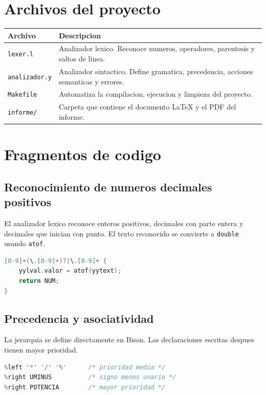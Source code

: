 \documentclass[12pt,a4paper]{article}
\begin{document}
\section{Archivos del proyecto}

\begin{longtable}{|p{4cm}|p{10cm}|}
\hline
\textbf{Archivo} & \textbf{Descripcion} \\
\hline
\texttt{lexer.l} & Analizador lexico. Reconoce numeros, operadores, parentesis y saltos de linea. \\
\hline
\texttt{analizador.y} & Analizador sintactico. Define gramatica, precedencia, acciones semanticas y errores. \\
\hline
\texttt{Makefile} & Automatiza la compilacion, ejecucion y limpieza del proyecto. \\
\hline
\texttt{informe/} & Carpeta que contiene el documento LaTeX y el PDF del informe. \\
\hline
\end{longtable}

\section{Fragmentos de codigo}

\subsection{Reconocimiento de numeros decimales positivos}

El analizador lexico reconoce enteros positivos, decimales con parte entera y decimales que inician con punto. El texto reconocido se convierte a \texttt{double} usando \texttt{atof}.

\begin{lstlisting}[language=C]
[0-9]+(\.[0-9]+)?|\.[0-9]+ {
    yylval.valor = atof(yytext);
    return NUM;
}
\end{lstlisting}

\subsection{Precedencia y asociatividad}

La jerarquia se define directamente en Bison. Las declaraciones escritas despues tienen mayor prioridad.

\begin{lstlisting}[language=C]
%left '+' '-'          /* menor prioridad */
%left '*' '/' '%'      /* prioridad media */
%right UMINUS          /* signo menos unario */
%right POTENCIA        /* mayor prioridad */
\end{lstlisting}
\end{document}
